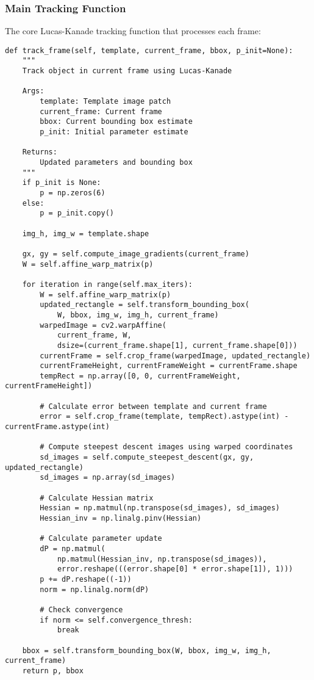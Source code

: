 \documentclass[12pt,a4paper]{article}
\begin{document}
\subsubsection{Main Tracking Function}
The core Lucas-Kanade tracking function that processes each frame:

\begin{lstlisting}[caption=Main Tracking Function]
def track_frame(self, template, current_frame, bbox, p_init=None):
    """
    Track object in current frame using Lucas-Kanade
    
    Args:
        template: Template image patch
        current_frame: Current frame
        bbox: Current bounding box estimate
        p_init: Initial parameter estimate
        
    Returns:
        Updated parameters and bounding box
    """
    if p_init is None:
        p = np.zeros(6)
    else:
        p = p_init.copy()

    img_h, img_w = template.shape
    
    gx, gy = self.compute_image_gradients(current_frame)
    W = self.affine_warp_matrix(p)
    
    for iteration in range(self.max_iters):
        W = self.affine_warp_matrix(p)
        updated_rectangle = self.transform_bounding_box(
            W, bbox, img_w, img_h, current_frame)
        warpedImage = cv2.warpAffine(
            current_frame, W, 
            dsize=(current_frame.shape[1], current_frame.shape[0]))
        currentFrame = self.crop_frame(warpedImage, updated_rectangle)
        currentFrameHeight, currentFrameWeight = currentFrame.shape
        tempRect = np.array([0, 0, currentFrameWeight, currentFrameHeight])

        # Calculate error between template and current frame
        error = self.crop_frame(template, tempRect).astype(int) - currentFrame.astype(int)

        # Compute steepest descent images using warped coordinates
        sd_images = self.compute_steepest_descent(gx, gy, updated_rectangle)
        sd_images = np.array(sd_images)

        # Calculate Hessian matrix
        Hessian = np.matmul(np.transpose(sd_images), sd_images)
        Hessian_inv = np.linalg.pinv(Hessian)

        # Calculate parameter update
        dP = np.matmul(
            np.matmul(Hessian_inv, np.transpose(sd_images)), 
            error.reshape(((error.shape[0] * error.shape[1]), 1)))
        p += dP.reshape((-1))
        norm = np.linalg.norm(dP)

        # Check convergence
        if norm <= self.convergence_thresh:
            break
            
    bbox = self.transform_bounding_box(W, bbox, img_w, img_h, current_frame)
    return p, bbox
\end{lstlisting}
\end{document}
